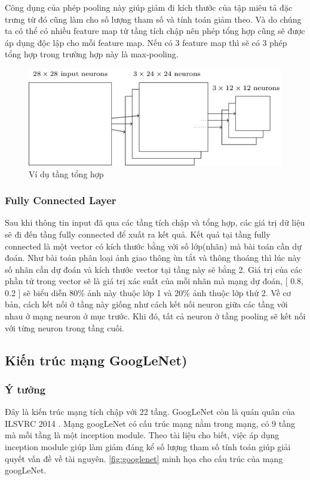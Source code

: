 		Công dụng của phép pooling này giúp giảm đi kích thước của tập miêu tả đặc trưng từ đó cũng làm cho số lượng tham số và tính toán giảm theo. Và do chúng ta có thể có nhiều feature map từ tầng tích chập nên phép tổng hợp cũng sẽ được áp dụng độc lập cho mỗi feature map. Nếu có 3 feature map thì sẽ có 3 phép tổng hợp trong trường hợp này là max-pooling.
		
		\begin{figure}[h!]
			\centering
			\includegraphics[scale=0.5]{charts/pooling_ex.png}
			\caption{Ví dụ tầng tổng hợp}
			\label{fig:pooling_ex}
		\end{figure}
		
	
	\subsubsection{Fully Connected Layer}
		Sau khi thông tin input đã qua các tầng tích chập và tổng hợp, các giá trị dữ liệu sẽ đi đến tầng fully connected để xuất ra kết quả. Kết quả tại tầng fully connected là một vector có kích thước bằng với số lớp(nhãn) mà bài toán cần dự đoán. Như bài toán phân loại ảnh giao thông ùn tắt và thông thoáng thì lúc này số nhãn cần dự đoán và kích thước vector tại tầng này sẽ bằng 2. Giá trị của các phần tử trong vector sẽ là giá trị xác suất của mỗi nhãn mà mạng dự đoán, [ 0.8, 0.2 ] sẽ biểu diễn 80\% ảnh này thuộc lớp 1 và 20\% ảnh thuộc lớp thứ 2. Về cơ bản, cách kết nối ở tầng này giống như cách kết nối neuron giữa các tầng với nhau ở mạng neuron ở mục trước. Khi đó, tất cả neuron ở tầng pooling sẽ kết nối với từng neuron trong tầng cuối.
	
\subsection{Kiến trúc mạng GoogLeNet)}
	
	\subsubsection{Ý tưởng}
	Đây là kiến trúc mạng tích chập với 22 tầng. GoogLeNet còn là quán quân của ILSVRC 2014 \cite{1}. Mạng googLeNet có cấu trúc mạng nằm trong mạng, có 9 tầng mà mỗi tầng là một inception module. Theo tài liệu cho biết, việc áp dụng inception module giúp làm giảm đáng kể số lượng tham số tính toán giúp giải quyết vấn đề về tài nguyên. \ref{fig:googlenet} minh họa cho cấu trúc của mạng googLeNet.
	
